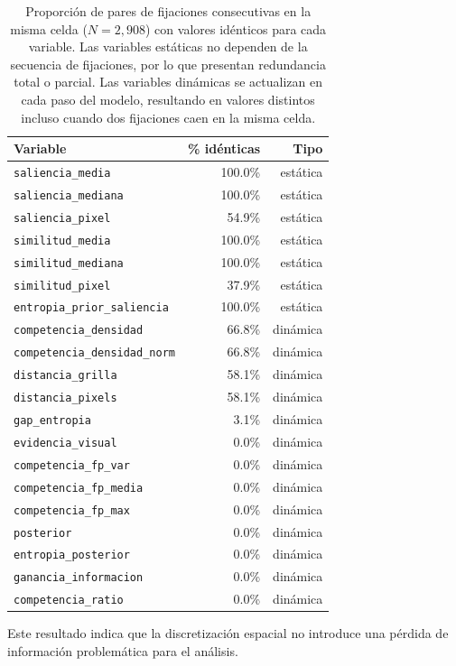 \begin{table}[H]
\centering
\small
\begin{tabular}{lrr}
\toprule
Variable & \% idénticas & Tipo \\
\midrule
\texttt{saliencia\_media}              & 100.0\% & estática \\
\texttt{saliencia\_mediana}            & 100.0\% & estática \\
\texttt{saliencia\_pixel}              &  54.9\% & estática \\
\texttt{similitud\_media}              & 100.0\% & estática \\
\texttt{similitud\_mediana}            & 100.0\% & estática \\
\texttt{similitud\_pixel}              &  37.9\% & estática \\
\texttt{entropia\_prior\_saliencia}    & 100.0\% & estática \\
\midrule
\texttt{competencia\_densidad}         &  66.8\% & dinámica \\
\texttt{competencia\_densidad\_norm}   &  66.8\% & dinámica \\
\texttt{distancia\_grilla}             &  58.1\% & dinámica \\
\texttt{distancia\_pixels}             &  58.1\% & dinámica \\
\texttt{gap\_entropia}                 &   3.1\% & dinámica \\
\texttt{evidencia\_visual}             &   0.0\% & dinámica \\
\texttt{competencia\_fp\_var}          &   0.0\% & dinámica \\
\texttt{competencia\_fp\_media}        &   0.0\% & dinámica \\
\texttt{competencia\_fp\_max}          &   0.0\% & dinámica \\
\texttt{posterior}                     &   0.0\% & dinámica \\
\texttt{entropia\_posterior}           &   0.0\% & dinámica \\
\texttt{ganancia\_informacion}         &   0.0\% & dinámica \\
\texttt{competencia\_ratio}            &   0.0\% & dinámica \\
\bottomrule
\end{tabular}
\caption{Proporción de pares de fijaciones consecutivas en la misma celda 
($N = 2{,}908$) con valores idénticos para cada variable. Las variables estáticas 
no dependen de la secuencia de fijaciones, por lo que presentan redundancia 
total o parcial. Las variables dinámicas se actualizan en cada paso del modelo, 
resultando en valores distintos incluso cuando dos fijaciones caen en la misma celda.}
\label{tab:pares_celda}
\end{table}

Este resultado indica que la discretización espacial no introduce una pérdida de información problemática para el análisis. 